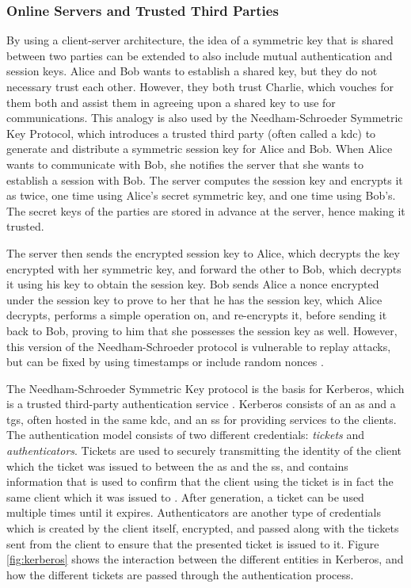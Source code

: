 \subsubsection{Online Servers and Trusted Third Parties}

By using a client-server architecture, the idea of a symmetric key that is shared between two parties can be extended to also include mutual authentication and session keys. Alice and Bob wants to establish a shared key, but they do not necessary trust each other. However, they both trust Charlie, which vouches for them both and assist them in agreeing upon a shared key to use for communications. This analogy is also used by the Needham-Schroeder Symmetric Key Protocol, which introduces a trusted third party (often called a \gls{kdc}) to generate and distribute a symmetric session key for Alice and Bob. When Alice wants to communicate with Bob, she notifies the server that she wants to establish a session with Bob. The server computes the session key and encrypts it as twice, one time using Alice's secret symmetric key, and one time using Bob's. The secret keys of the parties are stored in advance at the server, hence making it trusted.

The server then sends the encrypted session key to Alice, which decrypts the key encrypted with her symmetric key, and forward the other to Bob, which decrypts it using his key to obtain the session key. Bob sends Alice a nonce encrypted under the session key to prove to her that he has the session key, which Alice decrypts, performs a simple operation on, and re-encrypts it, before sending it back to Bob, proving to him that she possesses the session key as well. However, this version of the Needham-Schroeder protocol is vulnerable to replay attacks, but can be fixed by using timestamps or include random nonces \cite{needham1987authentication}.

The Needham-Schroeder Symmetric Key protocol is the basis for Kerberos, which is a trusted third-party authentication service \cite{neuman1994kerberos}. Kerberos consists of an \gls{as} and a \gls{tgs}, often hosted in the same \gls{kdc}, and an \gls{ss} for providing services to the clients. The authentication model consists of two different credentials: \emph{tickets} and \emph{authenticators}. Tickets are used to securely transmitting the identity of the client which the ticket was issued to between the \gls{as} and the \gls{ss}, and contains information that is used to confirm that the client using the ticket is in fact the same client which it was issued to \cite{steiner1988kerberos}. After generation, a ticket can be used multiple times until it expires. Authenticators are another type of credentials which is created by the client itself, encrypted, and passed along with the tickets sent from the client to ensure that the presented ticket is issued to it. Figure \ref{fig:kerberos} shows the interaction between the different entities in Kerberos, and how the different tickets are passed through the authentication process.

